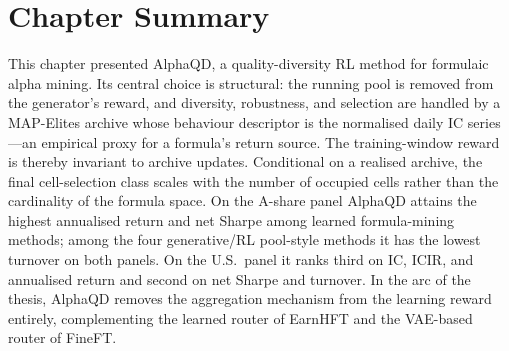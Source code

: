 \section{Chapter Summary}
\label{sec:alphaqd_summary}

This chapter presented AlphaQD, a quality-diversity RL method for formulaic alpha mining. Its central choice is structural: the running pool is removed from the generator's reward, and diversity, robustness, and selection are handled by a MAP-Elites archive whose behaviour descriptor is the normalised daily IC series---an empirical proxy for a formula's return source. The training-window reward is thereby invariant to archive updates. Conditional on a realised archive, the final cell-selection class scales with the number of occupied cells rather than the cardinality of the formula space. On the A-share panel AlphaQD attains the highest annualised return and net Sharpe among learned formula-mining methods; among the four generative/RL pool-style methods it has the lowest turnover on both panels. On the U.S.\ panel it ranks third on IC, ICIR, and annualised return and second on net Sharpe and turnover. In the arc of the thesis, AlphaQD removes the aggregation mechanism from the learning reward entirely, complementing the learned router of EarnHFT and the VAE-based router of FineFT.
